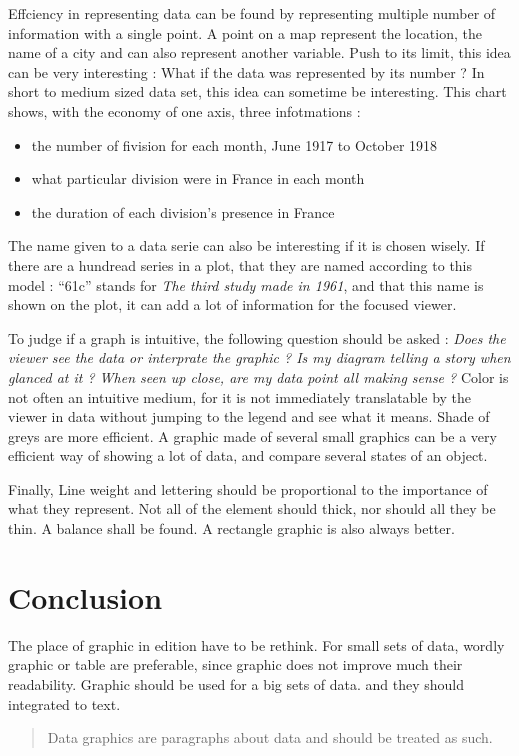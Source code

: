 Effciency in representing data can be found by representing multiple number of information with a single point. A point on a map represent the location, the name of a city and can also represent another variable.
 Push to its limit, this idea can be very interesting : What if the data was represented by its number ? In short to medium sized data set, this idea can sometime be interesting.
 This chart shows, with the economy of one axis, three infotmations : 
\begin{itemize}
\item the number of fivision for each month, June 1917 to October 1918
\item what particular division were in France in each month
\item the duration of each division's presence in France
\end{itemize}
The name given to a data serie can also be interesting if it is chosen wisely.
 If there are a hundread series in a plot, that they are named according to this model : ``61c'' stands for \emph{The third study made in 1961}, and that this name is shown on the plot, it can add a lot of information for the focused viewer.

To judge if a graph is intuitive, the following question should be asked : \emph{Does the viewer see the data or interprate the graphic ? Is my diagram telling a story when glanced at it ? When seen up close, are my data point all making sense ?}
 Color is not often an intuitive medium, for it is not immediately translatable by the viewer in data without jumping to the legend and see what it means. Shade of greys are more efficient. A graphic made of several small graphics can be a very efficient way of showing a lot of data, and compare several states of an object.

Finally, Line weight and lettering should be proportional to the importance of what they represent. Not all of the element should thick, nor should all they be thin. A balance shall be found. A rectangle graphic is also always better.
\section{Conclusion}

The place of graphic in edition have to be rethink. For small sets of data, wordly graphic or table are preferable, since graphic does not improve much their readability. Graphic should be used for a big sets of data. and they should integrated to text. 
\begin{quote}
Data graphics are paragraphs about data and should be treated as such.
\end{quote}
